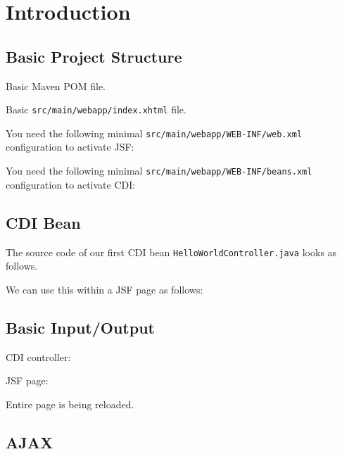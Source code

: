 %

\chapter{Introduction}

\section{Basic Project Structure}
Basic Maven POM file.


Basic \texttt{src/main/webapp/index.xhtml} file.


You need the following minimal \texttt{src/main/webapp/WEB-INF/web.xml} configuration to activate JSF:


You need the following minimal \texttt{src/main/webapp/WEB-INF/beans.xml} configuration to activate CDI:


\section{CDI Bean}

The source code of our first CDI bean \texttt{HelloWorldController.java} looks as follows.


We can use this within a JSF page as follows:


\section{Basic Input/Output}

CDI controller:


JSF page:


Entire page is being reloaded.

\section{AJAX}

